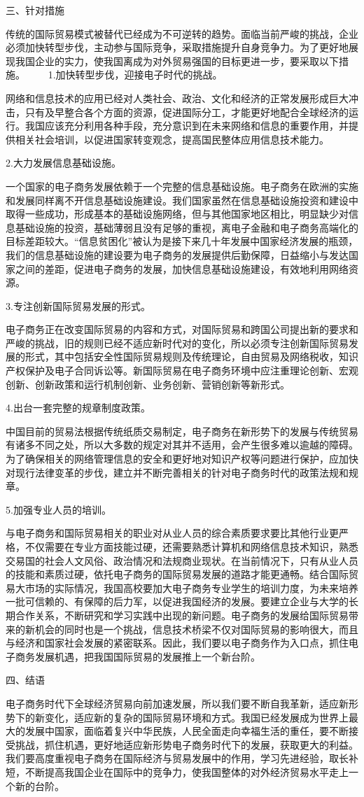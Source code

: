 三、针对措施

传统的国际贸易模式被替代已经成为不可逆转的趋势。面临当前严峻的挑战，企业必须加快转型步伐，主动参与国际竞争，采取措施提升自身竞争力。为了更好地展现我国企业的实力，使我国离成为对外贸易强国的目标更进一步，要采取以下措施。 　　1.加快转型步伐，迎接电子时代的挑战。

网络和信息技术的应用已经对人类社会、政治、文化和经济的正常发展形成巨大冲击，只有及早整合各个方面的资源，促进国际分工，才能更好地配合全球经济的运行。我国应该充分利用各种手段，充分意识到在未来网络和信息的重要作用，并提供相关社会培训，以促进国家转变观念，提高国民整体应用信息技术能力。

2.大力发展信息基础设施。

一个国家的电子商务发展依赖于一个完整的信息基础设施。电子商务在欧洲的实施和发展同样离不开信息基础设施建设。我们国家虽然在信息基础设施投资和建设中取得一些成功，形成基本的基础设施网络，但与其他国家地区相比，明显缺少对信息基础设施的投资，基础薄弱且没有足够的重视，离电子金融和电子商务高端化的目标差距较大。“信息贫困化”被认为是接下来几十年发展中国家经济发展的瓶颈，我们的信息基础设施的建设要为电子商务的发展提供后勤保障，日益缩小与发达国家之间的差距，促进电子商务的发展，加快信息基础设施建设，有效地利用网络资源。

3.专注创新国际贸易发展的形式。

电子商务正在改变国际贸易的内容和方式，对国际贸易和跨国公司提出新的要求和严峻的挑战，旧的规则已经不适应新时代对的变化，所以必须专注创新国际贸易发展的形式，其中包括安全性国际贸易规则及传统理论，自由贸易及网络税收，知识产权保护及电子合同诉讼等。新国际贸易在电子商务环境中应注重理论创新、宏观创新、创新政策和运行机制创新、业务创新、营销创新等新形式。

4.出台一套完整的规章制度政策。

中国目前的贸易法根据传统纸质交易制定，电子商务在新形势下的发展与传统贸易有诸多不同之处，所以大多数的规定对其并不适用，会产生很多难以逾越的障碍。为了确保相关的网络管理信息的安全和更好地对知识产权等问题进行保护，应加快对现行法律变革的步伐，建立并不断完善相关的针对电子商务时代的政策法规和规章。

5.加强专业人员的培训。

与电子商务和国际贸易相关的职业对从业人员的综合素质要求要比其他行业更严格，不仅需要在专业方面技能过硬，还需要熟悉计算机和网络信息技术知识，熟悉交易国的社会人文风俗、政治情况和法规商业现状。在当前情况下，只有从业人员的技能和素质过硬，依托电子商务的国际贸易发展的道路才能更通畅。结合国际贸易大市场的实际情况，我国高校要加大电子商务专业学生的培训力度，为未来培养一批可信赖的、有保障的后力军，以促进我国经济的发展。要建立企业与大学的长期合作关系，不断研究和学习实践中出现的新问题。电子商务的发展给国际贸易带来的新机会的同时也是一个挑战，信息技术桥梁不仅对国际贸易的影响很大，而且与经济和国家社会发展的紧密联系。因此，我们要以电子商务作为入口点，抓住电子商务发展机遇，把我国国际贸易的发展推上一个新台阶。

四、结语

电子商务时代下全球经济贸易向前加速发展，所以我们要不断自我革新，适应新形势下的新变化，适应新的复杂的国际贸易环境和方式。我国已经发展成为世界上最大的发展中国家，面临着复兴中华民族，人民全面走向幸福生活的重任，要不断接受挑战，抓住机遇，更好地适应新形势电子商务时代下的发展，获取更大的利益。我们要高度重视电子商务在国际经济与贸易发展中的作用，学习先进经验，取长补短，不断提高我国企业在国际中的竞争力，使我国整体的对外经济贸易水平走上一个新的台阶。